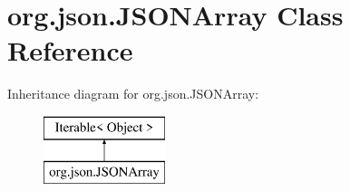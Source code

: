 \hypertarget{classorg_1_1json_1_1JSONArray}{\section{org.\-json.\-J\-S\-O\-N\-Array Class Reference}
\label{classorg_1_1json_1_1JSONArray}
}
Inheritance diagram for org.\-json.\-J\-S\-O\-N\-Array\-:\begin{figure}[H]
\begin{center}
\leavevmode
\includegraphics[height=2.000000cm]{classorg_1_1json_1_1JSONArray}
\end{center}
\end{figure}
